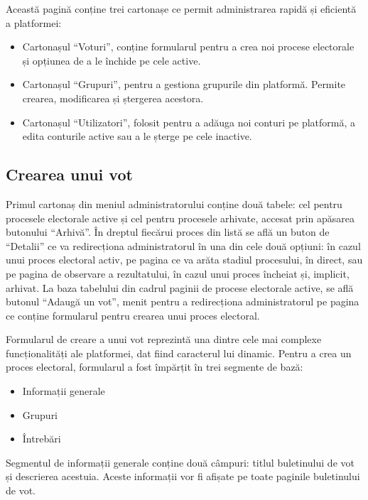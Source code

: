 Această pagină conține trei cartonașe ce permit administrarea rapidă și eficientă a platformei:

\begin{itemize}
    \item Cartonașul \enquote{Voturi}, conține formularul pentru a crea noi procese electorale și opțiunea de a le închide pe cele active.
    \item Cartonașul \enquote{Grupuri}, pentru a gestiona grupurile din platformă. Permite crearea, modificarea și ștergerea acestora.
    \item Cartonașul \enquote{Utilizatori}, folosit pentru a adăuga noi conturi pe platformă, a edita conturile active sau a le șterge pe cele inactive.
\end{itemize}

\newpage

\subsection{Crearea unui vot}

Primul cartonaș din meniul administratorului conține două tabele: cel pentru procesele electorale active și cel pentru procesele arhivate, accesat prin apăsarea butonului \enquote{Arhivă}. În dreptul fiecărui proces din listă se află un buton de \enquote{Detalii} ce va redirecționa administratorul în una din cele două opțiuni: în cazul unui proces electoral activ, pe pagina ce va arăta stadiul procesului, în direct, sau pe pagina de observare a rezultatului, în cazul unui proces încheiat și, implicit, arhivat. La baza tabelului din cadrul paginii de procese electorale active, se află butonul \enquote{Adaugă un vot}, menit pentru a redirecționa administratorul pe pagina ce conține formularul pentru crearea unui proces electoral.

Formularul de creare a unui vot reprezintă una dintre cele mai complexe funcționalități ale platformei, dat fiind caracterul lui dinamic. Pentru a crea un proces electoral, formularul a fost împărțit în trei segmente de bază:

\begin{itemize}
    \item Informații generale
    \item Grupuri
    \item Întrebări
\end{itemize}

Segmentul de informații generale conține două câmpuri: titlul buletinului de vot și descrierea acestuia. Aceste informații vor fi afișate pe toate paginile buletinului de vot.

